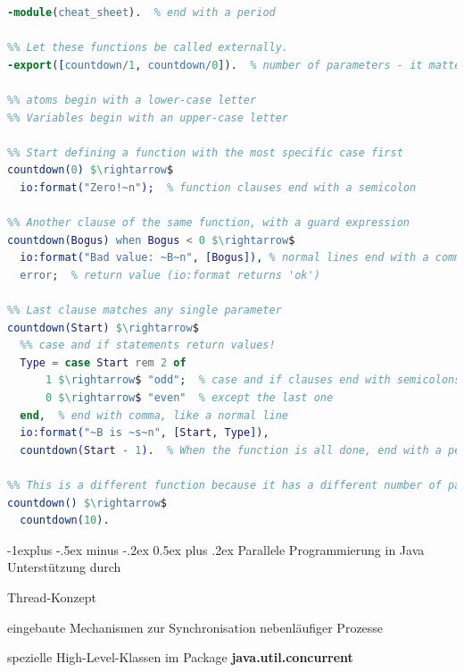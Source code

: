 \documentclass[10pt]{article}
\makeatletter
\renewcommand{\subsection}{\@startsection{subsection}{2}{0mm}%
                                {-1explus -.5ex minus -.2ex}%
                                {0.5ex plus .2ex}%
                                {\normalfont\normalsize\bfseries}}
\makeatother
\begin{document}
\begin{lstlisting}[language=erlang]
%[Hello.erl]
-module(cheat_sheet).  % end with a period

%% Let these functions be called externally.
-export([countdown/1, countdown/0]).  % number of parameters - it matters!

%% atoms begin with a lower-case letter
%% Variables begin with an upper-case letter

%% Start defining a function with the most specific case first
countdown(0) $\rightarrow$  
  io:format("Zero!~n");  % function clauses end with a semicolon

%% Another clause of the same function, with a guard expression
countdown(Bogus) when Bogus < 0 $\rightarrow$
  io:format("Bad value: ~B~n", [Bogus]), % normal lines end with a comma
  error;  % return value (io:format returns 'ok')
  
%% Last clause matches any single parameter
countdown(Start) $\rightarrow$
  %% case and if statements return values!
  Type = case Start rem 2 of
      1 $\rightarrow$ "odd";  % case and if clauses end with semicolons
      0 $\rightarrow$ "even"  % except the last one
  end,  % end with comma, like a normal line
  io:format("~B is ~s~n", [Start, Type]), 
  countdown(Start - 1).  % When the function is all done, end with a period

%% This is a different function because it has a different number of parameters.
countdown() $\rightarrow$
  countdown(10).
\end{lstlisting}


\subsection{Parallele Programmierung in Java}
Unterstützung durch
\begin{itemize*}
  \item Thread-Konzept
  \item eingebaute Mechanismen zur Synchronisation nebenläufiger Prozesse
  \item spezielle High-Level-Klassen im Package
  \newline \textbf{java.util.concurrent}
\end{itemize*}
\end{document}
